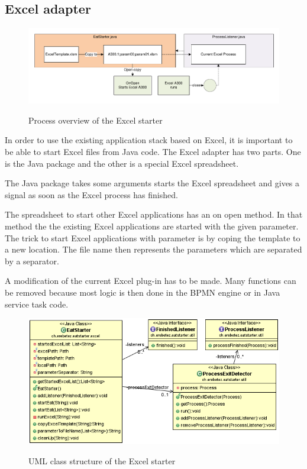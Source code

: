 \documentclass[paper=a4,twoside=false,BCOR=0mm,DIV=calc,fontsize=12pt]{scrartcl}
\begin{document}
\subsection{Excel adapter}

\begin{figure}
    \begin{center}
      \includegraphics[width=1\textwidth]{./img/eatstarterOverview.pdf}\\
    \end{center}
  \caption{Process overview of the Excel starter}
  \label{eatstarteroverview}
\end{figure} 

In order to use the existing application stack based on Excel, it is important to be able to start Excel files from Java code. 
The Excel adapter has two parts. One is the Java package and the other is a special Excel spreadsheet. 

The Java package takes some arguments starts the Excel spreadsheet and gives a signal as soon as the Excel process has finished.

The spreadsheet to start other Excel applications has an on open method. In that method the the existing Excel applications are started with the given parameter. The trick to start Excel applications with parameter is by coping the template to a new location. The file name then represents the parameters which are separated by a separator.

A modification of the current Excel plug-in has to be made. Many functions can be removed because most logic is then done in the BPMN engine or in Java service task code.

\begin{figure}
    \begin{center}
      \includegraphics[width=1\textwidth]{./img/uml_eatstatreter_model.png}\\
    \end{center}
  \caption{UML class structure of the Excel starter}
  \label{eatstarterclassuml}
\end{figure} 
\end{document}
